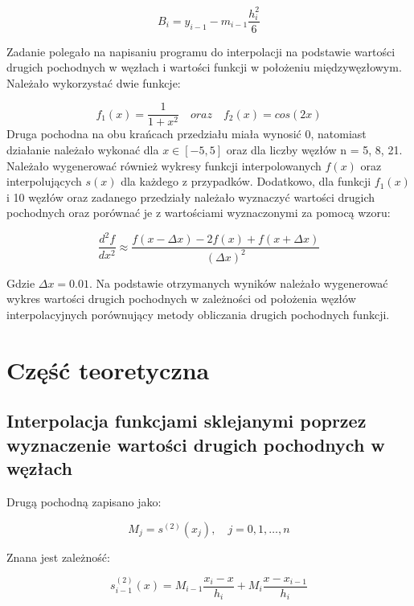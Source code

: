 \documentclass{article}
\begin{document}
\begin{equation}
B_i = y_{i-1} - m_{i-1} \frac{h_i^2}{6} \tag{10}
\end{equation}

\noindent
Zadanie polegało na napisaniu programu do interpolacji na podstawie wartości drugich pochodnych w węzłach i wartości funkcji w położeniu międzywęzłowym. Należało wykorzystać dwie funkcje:

\begin{equation*}
    f_1(x) = \frac{1}{1+x^2} \quad oraz \quad f_2(x) = cos(2x)
\end{equation*}
\noindent 
Druga pochodna na obu krańcach przedziału miała wynosić 0, natomiast działanie należało wykonać dla $x \in [-5,5]$ oraz dla liczby węzłów n = 5, 8, 21. Należało wygenerować również wykresy funkcji interpolowanych $f(x)$ oraz interpolujących $s(x)$ dla każdego z przypadków. Dodatkowo, dla funkcji $f_1(x)$ i 10 węzłów oraz zadanego przedziały należało wyznaczyć wartości drugich pochodnych oraz porównać je z wartościami wyznaczonymi za pomocą wzoru:

\begin{equation*}
    \frac{d^2f}{dx^2} \approx \frac{f(x - \Delta x) - 2f(x) + f(x + \Delta x)}{(\Delta x)^2}
\end{equation*} 

\noindent
Gdzie $\Delta x = 0.01$. Na podstawie otrzymanych wyników należało wygenerować wykres wartości drugich pochodnych w zależności od położenia węzłów interpolacyjnych porównujący metody obliczania drugich pochodnych funkcji.

\section{Część teoretyczna}

\subsection{Interpolacja funkcjami sklejanymi poprzez wyznaczenie wartości drugich pochodnych w węzłach}

Drugą pochodną zapisano jako: 

\begin{equation*}
M_j = s^{(2)}(x_j), \quad j = 0, 1, \ldots, n
\end{equation*}

\noindent
Znana jest zależność:

\begin{equation*}
s_{i-1}^{(2)}(x) = M_{i-1} \frac{x_i - x}{h_i} + M_i \frac{x - x_{i-1}}{h_i}
\end{equation*}
\end{document}
